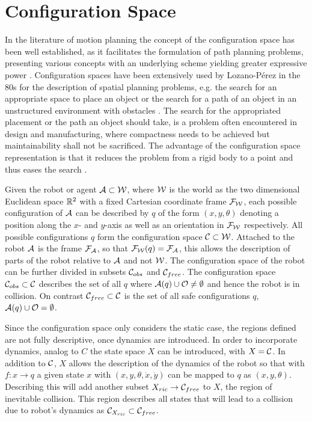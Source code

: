 \section{Configuration Space}
In the literature of motion planning the concept of the configuration space has been well established, as it facilitates the formulation of path planning problems, presenting various concepts with an underlying scheme yielding greater expressive power \cite{LaValle.2006,Latombe.1991}. Configuration spaces have been extensively used by Lozano-P\'{e}rez in the 80s for the description of spatial planning problems, e.g. the search for an appropriate space to place an object or the search for a path of an object in an unstructured environment with obstacles \cite{Latombe.1991}. The search for the appropriated placement or the path an object should take, is a problem often encountered in design and manufacturing, where compactness needs to be achieved but maintainability shall not be sacrificed. The advantage of the configuration space representation is that it reduces the problem from a rigid body to a point and thus eases the search \cite{LozanoPerez.1983}.

Given the robot or agent $\mathcal{A} \subset \mathcal{W}$, where $\mathcal{W}$ is the world as the two dimensional Euclidean space $\mathbb{R}^2$ with a fixed Cartesian coordinate frame $\mathcal{F}_{\mathcal{W}}$, each possible configuration of $\mathcal{A}$ can be described by $q$ of the form $(x,y,\theta)$ denoting a position along the $x$- and $y$-axis as well as an orientation in $\mathcal{F}_{\mathcal{W}}$ respectively. All possible configurations $q$ form the configuration space $\mathcal{C} \subset \mathcal{W}$. Attached to the robot $\mathcal{A}$ is the frame $\mathcal{F}_{\mathcal{A}}$, so that $\mathcal{F}_{\mathcal{W}}(q) = \mathcal{F}_{\mathcal{A}}$, this allows the description of parts of the robot relative to $\mathcal{A}$ and not $\mathcal{W}$. The configuration space of the robot can be further divided in subsets $\mathcal{C}_{obs}$ and $\mathcal{C}_{free}$. The configuration space $\mathcal{C}_{obs} \subset \mathcal{C}$ describes the set of all $q$ where $\mathcal{A}(q) \cup \mathcal{O} \neq \emptyset$ and hence the robot is in collision. On contrast $\mathcal{C}_{free} \subset \mathcal{C}$ is the set of all safe configurations $q$, $\mathcal{A}(q) \cup \mathcal{O} = \emptyset$. \cite{LaValle.2006,Latombe.1991}

Since the configuration space only considers the static case, the regions defined are not fully descriptive, once dynamics are introduced. In order to incorporate dynamics, analog to $C$ the state space $X$ can be introduced, with $X = \mathcal{C}$. In addition to $\mathcal{C}$, $X$ allows the description of the dynamics of the robot so that with $f: x \to q$ a given state $x$ with $(x,y,\theta,\dot{x},\dot{y})$ can be mapped to $q$ as $(x,y,\theta)$. Describing this will add another subset $X_{ric} \to \mathcal{C}_{free}$ to $X$, the region of inevitable collision. This region describes all states that will lead to a collision due to robot's dynamics as $\mathcal{C}_{X_{ric}} \subset \mathcal{C}_{free}$. \cite{LaValle.2006,Latombe.1991}

